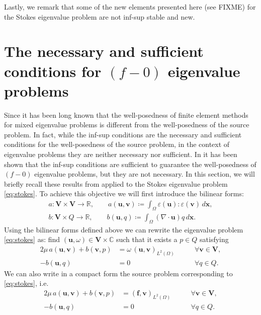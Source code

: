 \documentclass[USenglish]{article}
\theoremstyle{dgthm}
\theoremstyle{dgdef}
\let\vec\bm
\begin{document}
Lastly, we remark that some of the new elements presented here (see FIXME) for the Stokes eigenvalue problem are not inf-sup stable and new.

\section{The necessary and sufficient conditions for $(f\!-\!0)$ eigenvalue problems}
\label{sec:necessary_sufficient}
Since \cite{BBG} it has been long known that the well-posedness of finite element methods for mixed eigenvalue problems is different from the well-posedness of the source problem.
In fact, while the inf-sup conditions are the necessary and sufficient conditions for the well-posedness of the source problem, in the context of eigenvalue problems they are neither necessary nor sufficient.
In \cite{BBG} it has been shown that the inf-sup conditions are sufficient to guarantee the well-posedness of $(f\!-\!0)$ eigenvalue problems, but they are not necessary.
In this section, we will briefly recall these results from \cite{BBG} applied to the Stokes eigenvalue problem \eqref{eq:stokes}.
To achieve this objective we will first introduce the bilinear forms:
\begin{align}
  a: \vec{V}\times \vec{V}\to \mathbb{R}, \qquad a(\vec{u},\vec{v})\coloneqq\int_{\Omega}\varepsilon(\vec{u}):\varepsilon(\vec{v})\, d\vec{x},\label{eq:a}\\
  b: \vec{V}\times Q\to \mathbb{R}, \qquad b(\vec{u},q)\coloneqq\int_{\Omega} (\nabla\cdot \vec{u})q\, d\vec{x}\label{eq:b}.
\end{align}
Using the bilinear forms defined above we can rewrite the eigenvalue problem \eqref{eq:stokes} as: find $(\vec{u},\omega)\in \vec{V}\times \mathbb{C}$ such that it exists a $p\in Q$ satisfying
\begin{equation}
  \begin{aligned}
    2\mu\, a(\vec{u},\vec{v}) + b(\vec{v},p)&=\omega\, (\vec{u},\vec{v})_{L^2(\Omega)} \qquad &\forall \vec{v}\in \vec{V},\\
    -b(\vec{u},q)&=0 \qquad &\forall q\in Q.
  \end{aligned}
\end{equation}
We can also write in a compact form the source problem corresponding to \eqref{eq:stokes}, i.e.
\begin{equation}
  \label{eq:sourceStokes}
  \begin{aligned}
    2\mu\, a(\vec{u},\vec{v}) + b(\vec{v},p)&=(\vec{f},\vec{v})_{L^2(\Omega)} \qquad &\forall \vec{v}\in \vec{V},\\
    -b(\vec{u},q)&=0 \qquad &\forall q\in Q.
  \end{aligned}
\end{equation}
\end{document}
